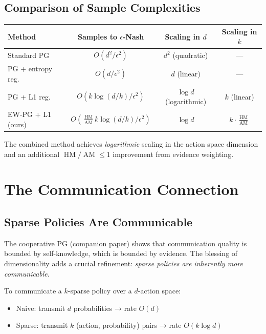 \documentclass[11pt,a4paper]{article}
\DeclareMathOperator{\AM}{AM}
\DeclareMathOperator{\HM}{HM}
\begin{document}
\subsection{Comparison of Sample Complexities}

\begin{center}
\begin{tabular}{lccc}
\hline
\textbf{Method} & \textbf{Samples to $\epsilon$-Nash} & \textbf{Scaling in $d$} & \textbf{Scaling in $k$} \\
\hline
Standard PG             & $O(d^2 / \epsilon^2)$                & $d^2$ (quadratic)     & --- \\
PG + entropy reg.       & $O(d / \epsilon^2)$                  & $d$ (linear)          & --- \\
PG + L1 reg.            & $O(k \log(d/k) / \epsilon^2)$        & $\log d$ (logarithmic) & $k$ (linear) \\
EW-PG + L1 (ours)       & $O(\frac{\HM}{\AM} k \log(d/k) / \epsilon^2)$ & $\log d$ & $k \cdot \frac{\HM}{\AM}$ \\
\hline
\end{tabular}
\end{center}

The combined method achieves \emph{logarithmic} scaling in the action space
dimension and an additional $\HM/\AM \leq 1$ improvement from evidence weighting.


\section{The Communication Connection}

\subsection{Sparse Policies Are Communicable}

The cooperative PG (companion paper) shows that communication quality
is bounded by self-knowledge, which is bounded by evidence. The
blessing of dimensionality adds a crucial refinement:
\emph{sparse policies are inherently more communicable}.

To communicate a $k$-sparse policy over a $d$-action space:
\begin{itemize}
  \item Naive: transmit $d$ probabilities → rate $O(d)$
  \item Sparse: transmit $k$ (action, probability) pairs → rate $O(k \log d)$
\end{itemize}
\end{document}
